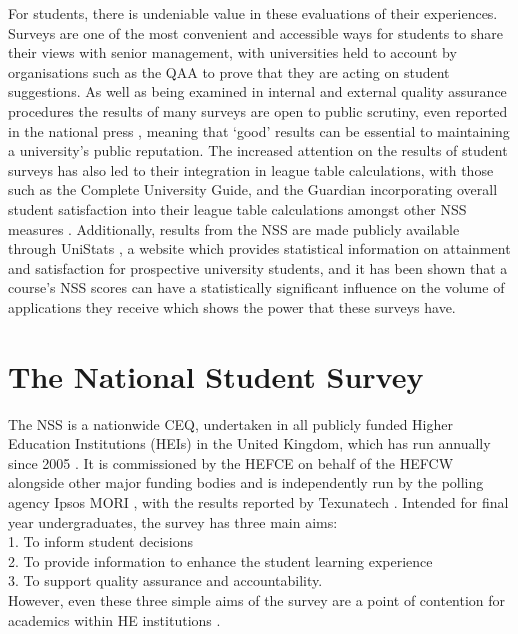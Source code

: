 \documentclass[11pt,a4paper]{report}
\begin{document}
For students, there is undeniable value in these evaluations of their experiences. Surveys are one of the most convenient and accessible ways for students to share their views with senior management, with universities held to account by organisations such as the \ac{QAA} \cite{QualityCode} to prove that they are acting on student suggestions. As well as being examined in internal and external quality assurance procedures the results of many surveys are open to public scrutiny, even reported in  the national press \cite{2015NSSNews},  meaning that `good' results can be essential to maintaining a university's public reputation. The increased attention on the results of student surveys has also led to their integration in league table calculations, with those such as the Complete University Guide, and the Guardian incorporating overall student satisfaction into their league table calculations amongst other NSS measures \cite{CompleteLeague, GuardianLeague}. Additionally, results from the NSS are made publicly available through UniStats \cite{UniStatssite}, a website which provides statistical information on attainment and satisfaction for prospective university students, and it has been shown that a course's NSS scores can have a statistically significant influence on the volume of applications they receive \cite{gibbons2013student} which shows the power that these surveys have.

\section{The National Student Survey}
The \ac{NSS} is a nationwide \ac{CEQ}, undertaken in all publicly funded Higher Education Institutions (HEIs) in the United Kingdom, which has run annually since 2005 \cite{2007initialnss}. It is commissioned by the \ac{HEFCE} on behalf of the \ac{HEFCW} alongside other major funding bodies and is independently run by the polling agency Ipsos MORI \cite{IpsosMoriNSS}, with the results reported by Texunatech \cite{TexunaNSS}. Intended for final year undergraduates, the survey has three main aims: \\
1. To inform student decisions\\
2. To provide information to enhance the student learning experience \\
3. To support quality assurance and accountability.\\
However, even these three simple aims of the survey are a point of contention for academics within HE institutions \cite{child2011perception}. 
\end{document}
